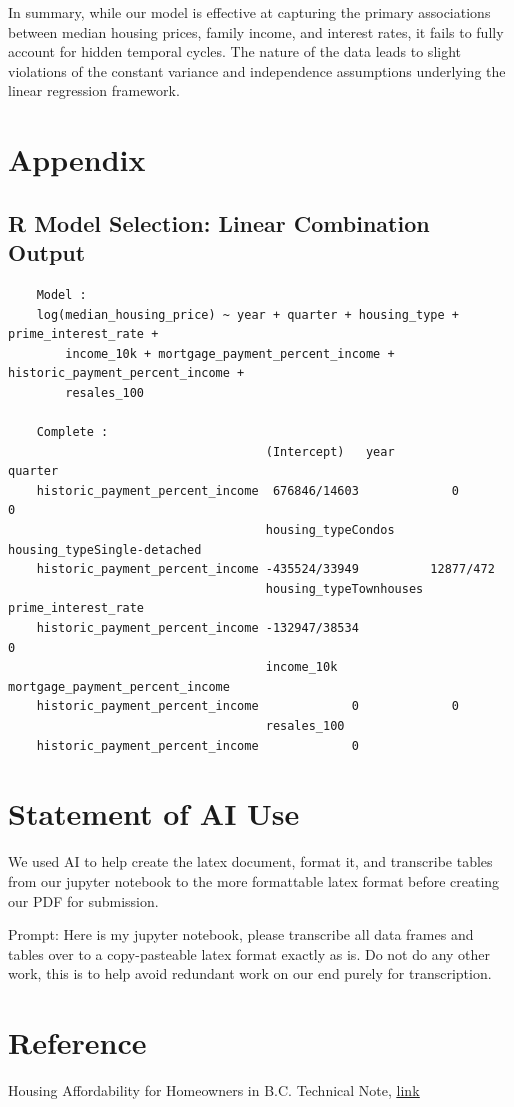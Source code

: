 \documentclass[10pt]{article}
\begin{document}
In summary, while our model is effective at capturing the primary associations between median housing prices, family income, and interest rates, it fails to fully account for hidden temporal cycles. The nature of the data leads to slight violations of the constant variance and independence assumptions underlying the linear regression framework.

\newpage
\section*{Appendix}
\subsection*{R Model Selection: Linear Combination Output}
\begin{small}
    \begin{verbatim}
    Model :
    log(median_housing_price) ~ year + quarter + housing_type + prime_interest_rate + 
        income_10k + mortgage_payment_percent_income + historic_payment_percent_income + 
        resales_100

    Complete :
                                    (Intercept)   year          quarter      
    historic_payment_percent_income  676846/14603             0             0
                                    housing_typeCondos housing_typeSingle-detached
    historic_payment_percent_income -435524/33949          12877/472              
                                    housing_typeTownhouses prime_interest_rate
    historic_payment_percent_income -132947/38534                      0      
                                    income_10k    mortgage_payment_percent_income
    historic_payment_percent_income             0             0                  
                                    resales_100  
    historic_payment_percent_income             0
    \end{verbatim}
\end{small}

\section*{Statement of AI Use}
We used AI to help create the latex document, format it, and transcribe tables from our jupyter notebook to the more formattable latex format before creating our PDF for submission.

Prompt: Here is my jupyter notebook, please transcribe all data frames and tables over to a copy-pasteable latex format exactly as is. Do not do any other work, this is to help avoid redundant work on our end purely for transcription.

\section*{Reference}
Housing Affordability for Homeowners in B.C. Technical Note,
\href{https://catalogue.data.gov.bc.ca/dataset/b-c-housing-affordability/resource/f8153a37-f18d-4d4e-bbe6-77f648bc1f31=}{\underline{link}}
\end{document}
